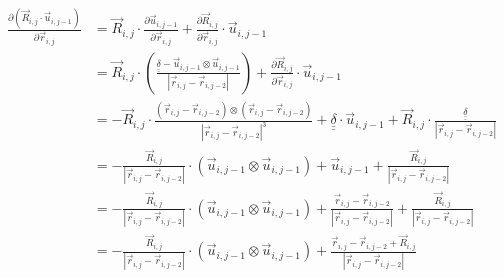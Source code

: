 \documentclass{article}
\renewcommand{\ij}{_{i,j}}
\newcommand{\ijj}{_{i,j-1}}
\newcommand{\ijk}{_{i,j-2}}
\newcommand{\ijjj}{_{i,j-2}}
\newcommand{\magn}[1]{\left\vert #1 \right\vert }
\renewcommand{\part}[2]{\frac{\partial #1 }{\partial #2}}
\newcommand{\ten}[1]{\underline{\underline{#1}}}
\newcommand{\rij}{\vec{r} \ij}
\newcommand{\Rij}{\vec{R} \ij}
\newcommand{\rijjj}{\vec{r} \ijjj}
\newcommand{\uijj}{\vec{u} \ijj}
\begin{document}
\begin{align*}
  \part{\left(\vec{R}\ij \cdot \vec{u} \ijj \right)}{\vec{r}\ij}   
  &= 
  \vec{R}\ij \cdot \part{\vec{u} \ijj}{\vec{r} \ij} + \part{\vec{R} \ij}{\vec{r} \ij} \cdot \vec{u}\ijj
  \\
  &= 
  \vec{R}\ij \cdot 
  \left(
  {
  \frac{\ten{\delta} - \uijj \otimes \uijj}{\magn{\rij - \rijjj}}
  }
  \right)
  +
  \part{\vec{R} \ij}{\vec{r} \ij} \cdot \vec{u}\ijj
  \\
  &= 
  - \vec{R}\ij \cdot  \frac{(\rij - \vec{r}\ijjj)
  \otimes
  (\rij - \vec{r}\ijjj)}
  {\magn{\vec{r} \ij - \vec{r}\ijk}^3}
  + \ten{\delta} \cdot \vec{u} \ijj 
  + \Rij \cdot \frac{\ten{\delta}}{\magn{\rij - \rijjj}}
  \\
  &= 
  -\frac{\vec{R} \ij}{\magn{\rij - \rijjj}} \cdot (\uijj \otimes \uijj ) 
  +  \uijj
  +  \frac{\Rij}{\magn{\rij - \rijjj}}
  \\
  &= 
  -\frac{\vec{R} \ij}{\magn{\rij - \rijjj}} \cdot (\uijj \otimes \uijj ) 
  +  \frac{\rij - \rijjj}{\magn{\rij - \rijjj}}
  +  \frac{\Rij}{\magn{\rij - \rijjj}}
  \\
  &= 
  -\frac{\vec{R} \ij}{\magn{\rij - \rijjj}} \cdot (\uijj \otimes \uijj ) 
  +  \frac{\rij - \rijjj + \Rij}{\magn{\rij - \rijjj}}
\end{align*}
\end{document}
